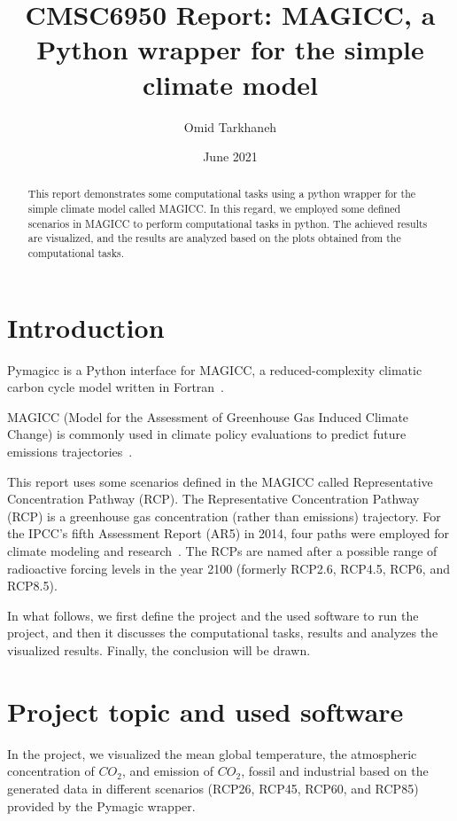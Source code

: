 \documentclass[12pt]{article}
\title{CMSC6950 Report: MAGICC, a Python wrapper for the simple climate model  }
\date{June 2021}
\author{Omid Tarkhaneh}
\begin{document}
\maketitle


\begin{abstract}
This report demonstrates some computational tasks using a python wrapper for the simple climate model called MAGICC. In this regard, we employed some defined scenarios in MAGICC to perform computational tasks in python. The achieved results are visualized, and the results are analyzed based on the plots obtained from the computational tasks.
\end{abstract}


\section{Introduction} 
\label{sec:intro}
Pymagicc is a Python interface for MAGICC, a reduced-complexity climatic carbon cycle model written in Fortran~\cite{Gieseke2018,meinshausen2011emulating}.

MAGICC (Model for the Assessment of Greenhouse Gas Induced Climate Change) is commonly used in climate policy evaluations to predict future emissions trajectories~\cite{Gieseke2018}.

This report uses some scenarios defined in the MAGICC called Representative Concentration Pathway (RCP).
The Representative Concentration Pathway (RCP) is a greenhouse gas concentration (rather than emissions) trajectory. For the IPCC's fifth Assessment Report (AR5) in 2014, four paths were employed for climate modeling and research~\cite{moss2008towards}. The RCPs are named after a possible range of radioactive forcing levels in the year 2100 (formerly RCP2.6, RCP4.5, RCP6, and RCP8.5).

In what follows, we first define the project and the used software to run the project, and then it discusses the computational tasks, results and analyzes the visualized results. Finally, the conclusion will be drawn.


\section{Project topic and used software}

In the project, we visualized the mean global temperature, the atmospheric concentration of $CO_2$, and emission of $CO_2$, fossil and industrial based on the generated data in different scenarios (RCP26, RCP45, RCP60, and RCP85) provided by the Pymagic wrapper.
\end{document}
